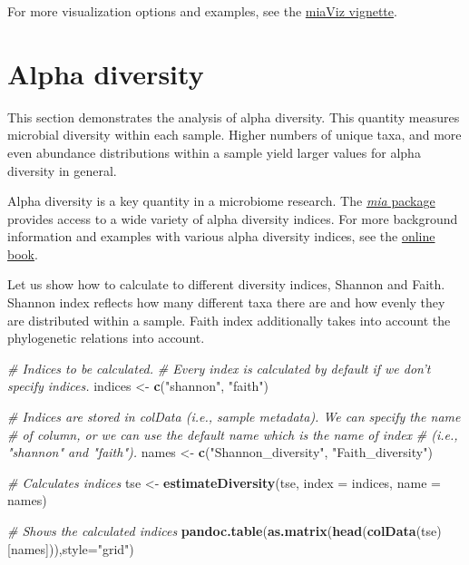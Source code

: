 \documentclass[
  oneside]{book}
\newenvironment{Shaded}{\begin{snugshade}}{\end{snugshade}}
\newcommand{\CommentTok}[1]{\textcolor[rgb]{0.56,0.35,0.01}{\textit{#1}}}
\newcommand{\DataTypeTok}[1]{\textcolor[rgb]{0.13,0.29,0.53}{#1}}
\newcommand{\KeywordTok}[1]{\textcolor[rgb]{0.13,0.29,0.53}{\textbf{#1}}}
\newcommand{\NormalTok}[1]{#1}
\newcommand{\StringTok}[1]{\textcolor[rgb]{0.31,0.60,0.02}{#1}}
\begin{document}
For more visualization options and examples, see the \href{https://microbiome.github.io/miaViz/articles/miaViz.html}{miaViz vignette}.

\hypertarget{alpha-diversity}{%
\chapter{Alpha diversity}\label{alpha-diversity}}

This section demonstrates the analysis of alpha diversity. This
quantity measures microbial diversity within each sample. Higher
numbers of unique taxa, and more even abundance distributions within a
sample yield larger values for alpha diversity in general.

Alpha diversity is a key quantity in a microbiome research. The \href{https://microbiome.github.io/mia/}{\emph{mia}
package} provides access to a wide
variety of alpha diversity indices. For more background information
and examples with various alpha diversity indices, see the \href{https://microbiome.github.io/OMA/microbiome-diversity.html\#alpha-diversity}{online
book}.

Let us show how to calculate to different diversity indices, Shannon
and Faith. Shannon index reflects how many different taxa there are
and how evenly they are distributed within a sample. Faith index
additionally takes into account the phylogenetic relations into
account.

\begin{Shaded}
\begin{Highlighting}[]
\CommentTok{# Indices to be calculated. }
\CommentTok{# Every index is calculated by default if we don't specify indices.}
\NormalTok{indices <-}\StringTok{ }\KeywordTok{c}\NormalTok{(}\StringTok{"shannon"}\NormalTok{, }\StringTok{"faith"}\NormalTok{)}

\CommentTok{# Indices are stored in colData (i.e., sample metadata). We can specify the name}
\CommentTok{# of column, or we can use the default name which is the name of index }
\CommentTok{# (i.e., "shannon" and "faith"). }
\NormalTok{names <-}\StringTok{ }\KeywordTok{c}\NormalTok{(}\StringTok{"Shannon_diversity"}\NormalTok{, }\StringTok{"Faith_diversity"}\NormalTok{)}

\CommentTok{# Calculates indices}
\NormalTok{tse <-}\StringTok{ }\KeywordTok{estimateDiversity}\NormalTok{(tse, }\DataTypeTok{index =}\NormalTok{ indices, }\DataTypeTok{name =}\NormalTok{ names)}

\CommentTok{# Shows the calculated indices}
\KeywordTok{pandoc.table}\NormalTok{(}\KeywordTok{as.matrix}\NormalTok{(}\KeywordTok{head}\NormalTok{(}\KeywordTok{colData}\NormalTok{(tse)[names])),}\DataTypeTok{style=}\StringTok{"grid"}\NormalTok{)}
\end{Highlighting}
\end{Shaded}
\end{document}

